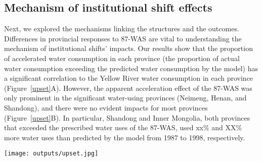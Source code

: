 
\subsection{Mechanism of institutional shift effects}
\label{reason}
Next, we explored the mechanisms linking the structures and the outcomes.
Differences in provincial responses to 87-WAS are vital to understanding the mechanism of institutional shifts' impacts.
Our results show that the proportion of accelerated water consumption in each province (the proportion of actual water consumption exceeding the predicted water consumption by the model) has a significant correlation to the Yellow River water consumption in each province (Figure~\ref{upset}A).
However, the apparent acceleration effect of the 87-WAS was only prominent in the significant water-using provinces (Neimeng, Henan, and Shandong), and there were no evident impacts for most provinces (Figure~\ref{upset}B).
In particular, Shandong and Inner Mongolia, both provinces that exceeded the prescribed water uses of the 87-WAS, used xx\% and XX\% more water uses than predicted by the model from 1987 to 1998, respectively.

\begin{figure*}[!h]
    \centering
    \texttt{[image: outputs/upset.jpg]}
    \caption{
        \textbf{A.} The partial correlation coefficient between wate uses (WU) of Yellow River (YR), unsatisfied ratio (compared with requirements in water plan and supply in the 87-WAS), and the average accelerated ratio.
        \textbf{B.} Average accelerated ratio of water uses for each province in the YRB during the decade after 87-WAS (from 1987 to 1998).
        \textbf{Mian users:} Major water consumption provinces (over the median).
        \textbf{Overused:} violate the 87-WAS in average water uses.
    }
    \label{upset}
\end{figure*}

